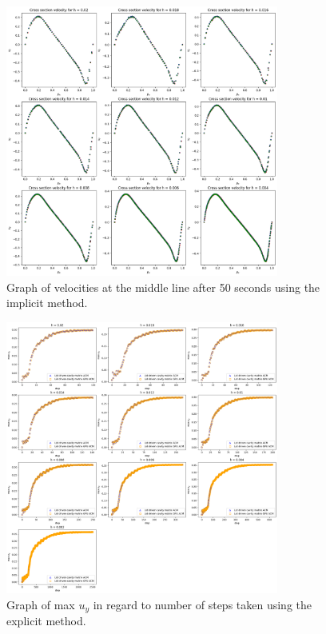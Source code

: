 \documentclass{article}
\begin{document}
\begin{figure}[h!] 
    \centering 
    \includegraphics[width=0.8\textwidth]{plots/lidDriven_cross.png} 
    \caption{Graph of velocities at the middle line after 50 seconds using the implicit method.} 
    \label{fig:lidDriven_cross} 
\end{figure}
\begin{figure}[h!] 
    \centering 
    \includegraphics[width=0.8\textwidth]{plots/lidDrivenACM_convergence.png} 
    \caption{Graph of max $u_y$ in regard to number of steps taken using the explicit method.} 
    \label{fig:lidDrivenACM_convergence} 
\end{figure}
\end{document}
